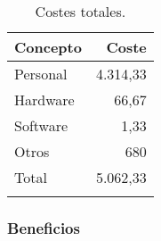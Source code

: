 \begin{longtable}[]{@{}lr@{}}
	\toprule
	\begin{minipage}[b]{0.22\columnwidth}\raggedright\strut
		\textbf{Concepto}\strut
	\end{minipage} & \begin{minipage}[b]{0.22\columnwidth}\raggedright\strut
		\textbf{Coste}\strut
	\end{minipage}\tabularnewline
	\midrule
	\endhead
	\begin{minipage}[t]{0.22\columnwidth}\raggedright\strut
		Personal\strut
	\end{minipage} & \begin{minipage}[t]{0.22\columnwidth}\raggedright\strut
		4.314,33 \officialeuro\strut
	\end{minipage}\tabularnewline
	\begin{minipage}[t]{0.22\columnwidth}\raggedright\strut
		Hardware\strut
	\end{minipage} & \begin{minipage}[t]{0.22\columnwidth}\raggedright\strut
		66,67 \officialeuro\strut
	\end{minipage}\tabularnewline
	\begin{minipage}[t]{0.22\columnwidth}\raggedright\strut
		Software\strut
	\end{minipage} & \begin{minipage}[t]{0.22\columnwidth}\raggedright\strut
		1,33 \officialeuro\strut
	\end{minipage}\tabularnewline
	\begin{minipage}[t]{0.22\columnwidth}\raggedright\strut
		Otros\strut
	\end{minipage} & \begin{minipage}[t]{0.22\columnwidth}\raggedright\strut
		680 \officialeuro\strut
	\end{minipage}\tabularnewline
	\midrule
	\begin{minipage}[t]{0.22\columnwidth}\raggedright\strut
		Total\strut
	\end{minipage} & \begin{minipage}[t]{0.22\columnwidth}\raggedright\strut
		5.062,33 \officialeuro\strut
	\end{minipage}\tabularnewline
	\bottomrule
	\caption{Costes totales.}
\end{longtable}

\subsubsection{Beneficios}

